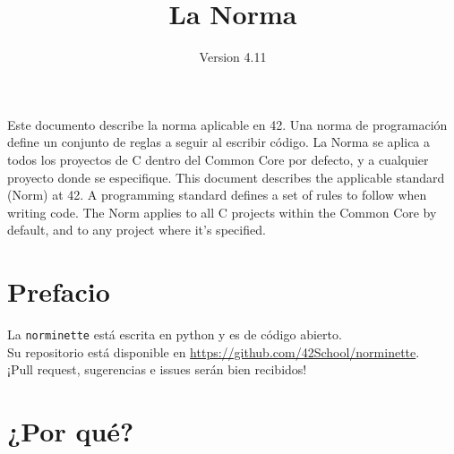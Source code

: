 \documentclass{42-es}
\begin{document}
\title{La Norma}
\subtitle{Version 4.11}

\summary
{
      Este documento describe la norma aplicable en 42. Una norma de
      programación
      define un conjunto de reglas a seguir al escribir código. La Norma se
      aplica
      a todos los proyectos de C dentro del Common Core por defecto, y a
      cualquier
      proyecto donde se especifique.
      This document describes the applicable standard (Norm) at 42. A
      programming standard defines a set of rules to follow when writing code.
      The Norm applies to all C projects within the Common Core by default, and
      to any project where it's specified.
}

\maketitle

\tableofcontents

\chapter{Prefacio}

La \texttt{norminette} está escrita en python y es de código abierto. \\
Su repositorio está disponible en \url{https://github.com/42School/norminette}.\\
¡Pull request, sugerencias e issues serán bien recibidos!

\newpage

%
%
\chapter{¿Por qué?}
\end{document}
